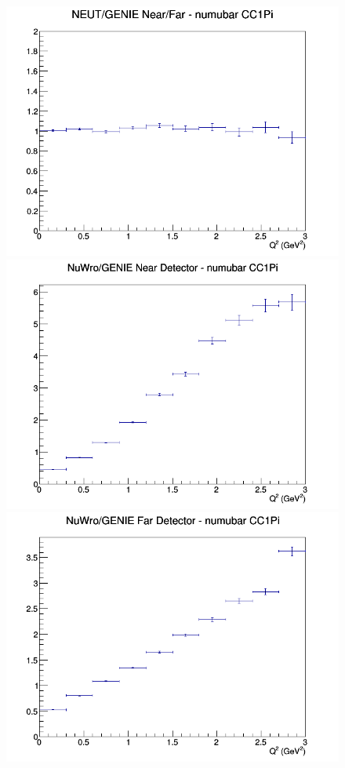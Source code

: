 \begin{figure}[h]
\endminipage
{}
\includegraphics[width=\linewidth]{Q2/nominal/ratios/CC1Pi_NEUT_GENIE_numubar_NF_Q2.png}
\endminipage
\newline
{}
\includegraphics[width=\linewidth]{Q2/nominal/ratios/CC1Pi_NuWro_GENIE_numubar_near_Q2.png}
\endminipage
{}
\includegraphics[width=\linewidth]{Q2/nominal/ratios/CC1Pi_NuWro_GENIE_numubar_far_Q2.png}

\end{figure}
